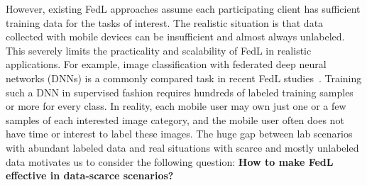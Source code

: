 However, existing FedL approaches assume each participating client has sufficient training data for the tasks of interest. The realistic situation is that data collected with mobile devices can be insufficient and almost always unlabeled. This severely limits the practicality and scalability of FedL in realistic applications.
For example, image classification with federated deep neural networks (DNNs) is a commonly compared task in recent FedL studies~\cite{fedavg,zhao2018federated,li2020federated}. Training such a DNN in supervised fashion requires hundreds of labeled training samples or more for every class. In reality, each mobile user may own just one or a few samples of each interested image category, and the mobile user often does not have time or interest to label these images. The huge gap between lab scenarios with abundant labeled data and real situations with scarce and mostly unlabeled data motivates us to consider the following question: \textbf{How to make FedL effective in data-scarce scenarios?}





